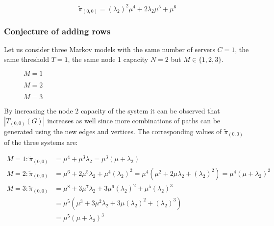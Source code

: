 \begin{equation*}
    \tilde{\pi}_{(0,0)} = (\lambda_2)^2 \mu^4 + 2 \lambda_2 \mu^5 + \mu^6
\end{equation*}

\subsubsection{Conjecture of adding rows}

Let us consider three Markov models with the same number of servers \(C=1\),
the same threshold \(T=1\), the same node 1 capacity \(N=2\) but
\(M\in\{1, 2, 3\}\).


\begin{multicols}{3}
    \begin{figure}[H]
        \centering
        \scalebox{0.65}{
            }
        \caption[]{\(M=1\)}
    \end{figure}
    \columnbreak
    \begin{figure}[H]
        \centering
        \scalebox{0.65}{
            }
        \caption[]{\(M=2\)}
    \end{figure}
    \begin{figure}[H]
        \centering
        \scalebox{0.65}{
            }
        \caption[]{\(M=3\)}
    \end{figure}
\end{multicols}

By increasing the node 2 capacity of the system it can be observed that
\(|T_{(0,0)}(G)|\) increases as well since more combinations of paths can be
generated using the new edges and vertices.
The corresponding values of \(\tilde{\pi}_{(0,0)}\) of the three systems are:

\begin{align}
    M = 1: \tilde{\pi}_{(0,0)} &= \mu^4 + \mu^3 \lambda_2 =
    \mu^3 (\mu + \lambda_2) \label{eq:rows_conjecture_1}\\
    M = 2: \tilde{\pi}_{(0,0)} &= \mu^6 + 2\mu^5 \lambda_2 + \mu^4 (\lambda_2)^2
    = \mu^4(\mu^2 + 2\mu \lambda_2 + (\lambda_2)^2)
    = \mu^4 (\mu + \lambda_2) ^ 2 \label{eq:rows_conjecture_2}\\
    M = 3: \tilde{\pi}_{(0,0)} &= \mu^8 + 3 \mu^7 \lambda_2 +
    3 \mu^6 (\lambda_2)^2 + \mu^5(\lambda_2)^3 \nonumber \\
    &= \mu^5 (\mu^3 + 3 \mu ^2 \lambda_2 + 3 \mu (\lambda_2)^2 + (\lambda_2)^3)
    \nonumber \\
    &= \mu^5 (\mu + \lambda_2) ^ 3 \label{eq:rows_conjecture_3}
\end{align}

